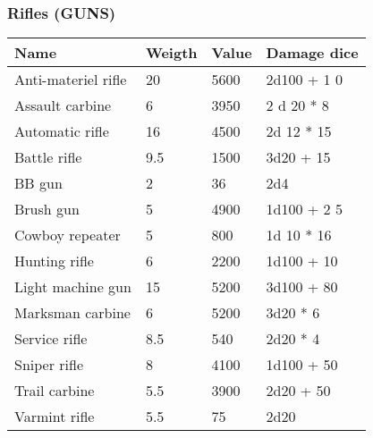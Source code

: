 
\subsubsection{Rifles (GUNS)}
\begin{longtable}{|p{4cm}|p{1.5cm}|p{1.5cm}|p{9cm}|}
\hline
\bfseries Name & \bfseries Weigth & \bfseries Value & \bfseries Damage dice \\
\hline
\endhead
Anti-materiel rifle & 20 & 5600 & 2d100 + 1 0 \\
Assault carbine & 6 & 3950 & 2 d 20 * 8 \\
Automatic rifle & 16 & 4500 & 2d 12 * 15 \\
Battle rifle & 9.5 & 1500 & 3d20 + 15 \\
BB gun & 2 & 36 & 2d4 \\
Brush gun & 5 & 4900 & 1d100 + 2 5 \\
Cowboy repeater & 5 & 800 & 1d 10 * 16 \\
Hunting rifle & 6 & 2200 & 1d100 + 10 \\
Light machine gun & 15 & 5200 & 3d100 + 80 \\
Marksman carbine & 6 & 5200 & 3d20 * 6 \\
Service rifle & 8.5 & 540 & 2d20 * 4 \\
Sniper rifle & 8 & 4100 & 1d100 + 50 \\
Trail carbine & 5.5 & 3900 & 2d20 + 50 \\
Varmint rifle & 5.5 & 75 & 2d20 \\
\hline
\end{longtable}

